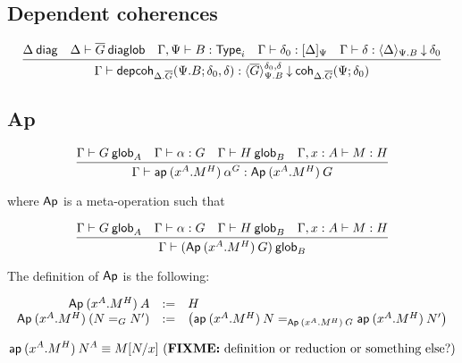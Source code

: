 \subsection{Dependent coherences}

\begin{small}
\[
\infer
  {\ofdepglob{\Gamma}{\depcoh{\Delta.\diag G}{\Psi.B}{\delta_0}{\delta}}
    {\interpdepglob{\diag G}{\Psi.B}{\delta_0}{\delta}}{\coh{\Delta.\diag
    G}{\Psi}{\delta_0}}}
  {\wfdiag{\Delta}
  &\wfdiaglob{\Delta}{\diag G}
  &\wftype{\Gamma,\Psi}{B}
  &\ofinterp{\Gamma}{\delta_0}{\Delta}{\Psi}
  &\ofinterpdep{\Gamma}{\delta}{\Delta}{\Psi.B}{\delta_0}}
\]
\end{small}

\subsection{Ap}


\begin{small}
  \[\infer{\ofglob{\Gamma}{\ap{(x^A.M^H)}{\alpha^G}}
    {\Ap{(x^A.M^H)}{G}}}
  {\wfglob{\Gamma}{G}{A}
    & \ofglob{\Gamma}{\alpha}{G}
    & \wfglob{\Gamma}{H}{B}
    & \ofglob{\Gamma,x:A}{M}{H}}\]

  where $\dsd{Ap}$ is a meta-operation such that

  \[\infer{\wfglob{\Gamma}{(\Ap{(x^A.M^H)}{G})}
    {B}}
  {\wfglob{\Gamma}{G}{A}
    & \ofglob{\Gamma}{\alpha}{G}
    & \wfglob{\Gamma}{H}{B}
    & \ofglob{\Gamma,x:A}{M}{H}}\]

  The definition of $\dsd{Ap}$ is the following:

  \[
  \begin{array}{rcl}
    \Ap{(x^A.M^H)}{A} & := & H \\
    \Ap{(x^A.M^H)}{(\homj{G}{N}{N'})} & := & \left(
      \homj{\Ap{(x^A.M^H)}{G}}
      {\ap{(x^A.M^H)}{N}}{\ap{(x^A.M^H)}{N'}}\right)
  \end{array}
  \]
\end{small}

\begin{small}
  \[
  \ap{(x^A.M^H)}{N^A}  \equiv  \subst{M}{N}{x}
  \text{ (\FIXME{definition or reduction or something else?})} \\ \\
  \]
\end{small}

